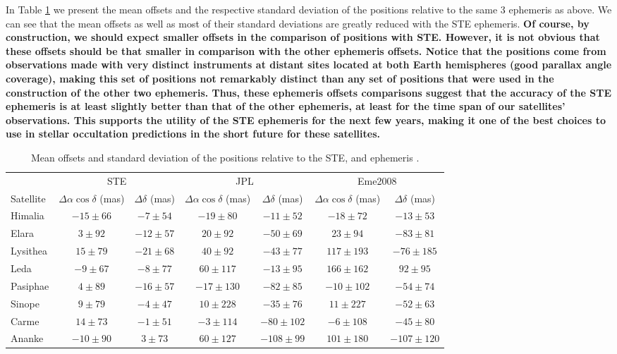 \documentclass[useAMS,usenatbib]{mn2e}
\begin{document}
In Table \ref{Tab:STE-error} we present the mean offsets and the respective standard deviation of the  positions relative to the same 3 ephemeris as above. We can see that the mean offsets as well as most of their standard deviations are greatly reduced with the STE ephemeris. \textbf{Of course, by construction, we should expect smaller offsets in the comparison of  positions with STE. However, it is not obvious that these offsets should be that smaller in comparison with the other ephemeris offsets. Notice that the  positions come from observations made with very distinct instruments at distant sites located at both Earth hemispheres (good parallax angle coverage), making this set of positions not remarkably distinct than any set of positions that were used in the construction of the other two ephemeris. Thus, these ephemeris offsets comparisons suggest that the accuracy of the STE ephemeris is at least slightly better than that of the other ephemeris, at least for the time span of our satellites' observations. This supports the utility of the STE ephemeris for the next few years, making it one of the best choices to use in stellar occultation predictions in the short future for these satellites.}

\begin{table}
\caption{\label{Tab:STE-error} Mean offsets and standard deviation of the \protect{} positions relative to the STE, \protect\cite{Jacobson2012} and \protect\cite{Emelyanov2005} ephemeris .}
\begin{centering}
\begin{tabular}{l|cc|cc|cc}
\hline  \hline
 & \multicolumn{2}{|c|}{STE} & \multicolumn{2}{|c|}{JPL} & \multicolumn{2}{|c}{Eme2008}\tabularnewline
Satellite  & $\Delta\alpha\cos\delta$ (mas) & $\Delta\delta$ (mas) & $\Delta\alpha\cos\delta$ (mas) & $\Delta\delta$ (mas) & $\Delta\alpha\cos\delta$ (mas) & $\Delta\delta$ (mas) \tabularnewline
\hline
Himalia & $-15\pm66$ & $-7\pm54$  & $-19\pm80$  & $-11\pm52$ & $-18\pm72$  & $-13\pm53$ \tabularnewline
Elara & $3\pm92$ & $-12\pm57$ & $20\pm92$ & $-50\pm69$ & $23\pm94$ & $-83\pm81$ \tabularnewline
Lysithea & $15\pm79$ & $-21\pm68$ & $40\pm92$ & $-43\pm77$ & $117\pm193$ & $-76\pm185$ \tabularnewline
Leda & $-9\pm67$ & $-8\pm77$ & $60\pm117$ & $-13\pm95$ & $166\pm162$ & $92\pm95$ \tabularnewline
Pasiphae & $4\pm89$ & $-16\pm57$ & $-17\pm130$ & $-82\pm85$ & $-10\pm102$ & $-54\pm74$ \tabularnewline
Sinope & $9\pm79$ & $-4\pm47$ & $10\pm228$ & $-35\pm76$ & $11\pm227$ & $-52\pm63$ \tabularnewline
Carme & $14\pm73$ & $-1\pm51$ & $-3\pm114$ & $-80\pm102$ & $-6\pm108$ & $-45\pm80$ \tabularnewline
Ananke & $-10\pm90$ & $3\pm73$ & $60\pm127$ & $-108\pm99$ & $101\pm180$ & $-107\pm120$ \tabularnewline
\hline
\end{tabular}
\par \end{centering}
\end{table}
\end{document}

